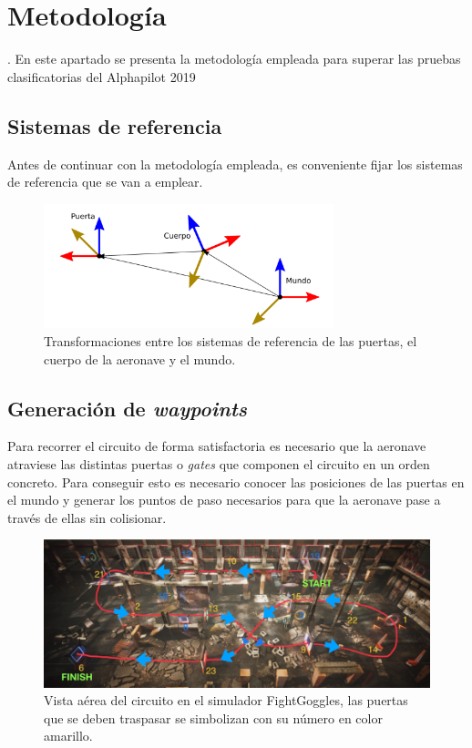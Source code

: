 \chapter{Metodología}
	
. En este apartado se presenta la metodología empleada para superar las pruebas clasificatorias del Alphapilot 2019 

\section{Sistemas de referencia}
Antes de continuar con la metodología empleada, es conveniente fijar los sistemas de referencia que se van a emplear. 

\begin{figure}[htb!]
	\centering
	\includegraphics[width=0.75\textwidth]{imagenes/frames}
	\caption{Transformaciones entre los sistemas de referencia de las puertas, el cuerpo de la aeronave y el mundo.}
	\label{waypoints:Refs}
\end{figure}



\section{Generación de \textit{waypoints}}
Para recorrer el circuito de forma satisfactoria es necesario que la aeronave atraviese las distintas puertas o \textit{gates} que componen el circuito en un orden concreto. Para conseguir esto es necesario conocer las posiciones de las puertas en el mundo y generar los puntos de paso necesarios para que la aeronave pase a través de ellas sin colisionar.

\begin{figure}[htb!]
	\centering
	\includegraphics[width=\textwidth]{imagenes/diagramacircuito}
	\caption{Vista aérea del circuito en el simulador FightGoggles, las puertas que se deben traspasar se simbolizan con su número en color amarillo.}
	\label{waypoints:circuito}
\end{figure}

